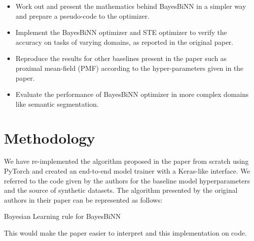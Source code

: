 \begin{itemize}
    \item Work out and present the mathematics behind BayesBiNN in a simpler way and prepare a pseudo-code to the optimizer.
    \item Implement the BayesBiNN optimizer and STE optimizer to verify the accuracy on tasks of varying domains, as reported in the original paper.
    \item Reproduce the results for other baselines present in the paper such as proximal mean-field (PMF) according to the hyper-parameters given in the paper.
    \item Evaluate the performance of BayesBiNN optimizer in more complex domains like semantic segmentation.
\end{itemize}


\section{Methodology}


We have re-implemented the algorithm proposed in the paper from scratch using PyTorch and created an end-to-end model trainer with a Keras-like interface. We referred to the code given by the authors for the baseline model hyperparameters and the source of synthetic datasets. The algorithm presented by the original authors in their paper can be represented as follows:

\begin{algorithm}[H]
\label{alg1}
\SetAlgoLined
\DontPrintSemicolon

 \;
 
 \caption{Bayesian Learning rule for BayesBiNN}
\end{algorithm}
This would make the paper easier to interpret and this implementation on code.

